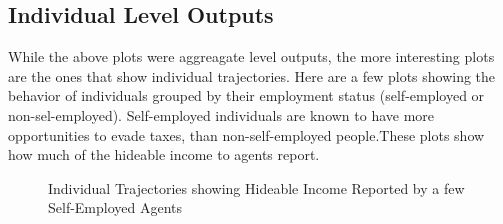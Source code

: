 \documentclass{article}
\begin{document}
\subsection{Individual Level Outputs}
While the above plots were aggreagate level outputs, the more interesting plots are the ones that show individual trajectories. Here are a few plots showing the behavior of individuals grouped by their employment status (self-employed or non-sel-employed). Self-employed individuals are known to have more opportunities to evade taxes, than non-self-employed people.These plots show how much of the hideable income to agents report. 

  \begin{figure}[ht]
		\caption{Individual Trajectories showing Hideable Income Reported by a few Self-Employed Agents}
	\end{figure}
	
\end{document}

